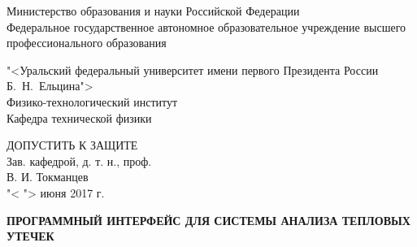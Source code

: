 \begin{titlepage}
\begin{center}

	\begin{normalsize}
		\noindent Министерство образования и науки Российской Федерации\\
		\noindent Федеральное государственное автономное образовательное учреждение высшего профессионального образования\\
	\end{normalsize}
	
	\noindent "<Уральский федеральный университет имени первого Президента России Б.~Н.~Ельцина">\\
	\noindent Физико-технологический институт \\
	\noindent Кафедра технической физики \\

	\par \vspace{1cm}

	\hfill\begin{minipage}{.5\textwidth}\centering
		\begin{large}
			\begin{center}
				ДОПУСТИТЬ К ЗАЩИТЕ \\
				Зав. кафедрой, д. т. н., проф. \\
				\underline{\hspace{3cm}} В. И. Токманцев \\
				"< \underline{\hspace{1cm}} "> июня 2017 г.
			\end{center}
		\end{large}
	\end{minipage}

	\par \vspace{1cm}
	\begin{Large}
		\textbf{ПРОГРАММНЫЙ ИНТЕРФЕЙС ДЛЯ СИСТЕМЫ АНАЛИЗА ТЕПЛОВЫХ УТЕЧЕК}
	\end{Large}


\end{center}
\end{titlepage}

